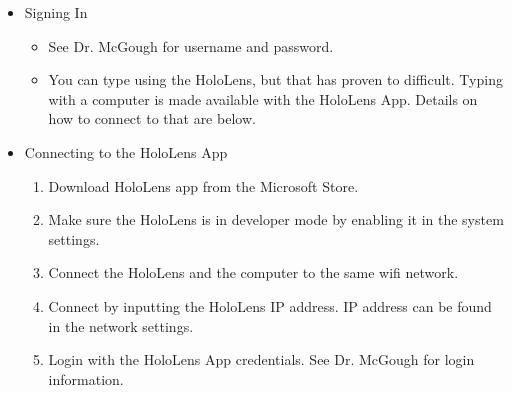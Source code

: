 \begin{itemize}
    \item Signing In
        \begin{itemize}
            \item See Dr. McGough for username and password. 

            \item You can type using the HoloLens, but that has proven to difficult. Typing with a computer is made available with the HoloLens App. Details on how to connect to that are below.
        \end{itemize}

    \item Connecting to the HoloLens App
        \begin{enumerate}
            \item Download HoloLens app from the Microsoft Store.
            \item Make sure the HoloLens is in developer mode by enabling it in the system settings.
            \item Connect the HoloLens and the computer to the same wifi network.
            \item Connect by inputting the HoloLens IP address. IP address can be found in the network settings.
            \item Login with the HoloLens App credentials. See Dr. McGough for login information.
        \end{enumerate}

\end{itemize}


